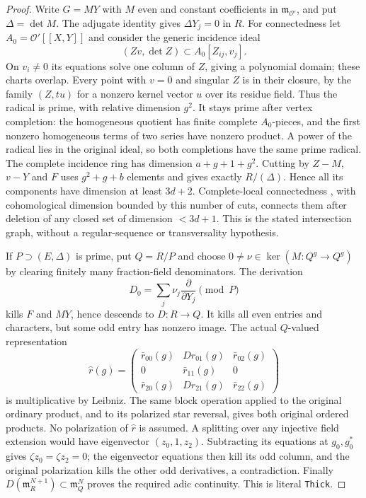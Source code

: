 \begin{proof}
Write $G=MY$ with $M$ even and constant coefficients in
$\mathfrak m_{\mathcal O'}$, and put $\Delta=\det M$.
The adjugate identity gives $\Delta Y_j=0$ in $R$.
For connectedness let $A_0=\mathcal O'[[X,Y]]$ and consider the
generic incidence ideal
\begin{equation}\label{eq:rankthree-incidence}
                  (Zv,\det Z)\subset A_0[Z_{ij},v_j].
\end{equation}
On $v_i\ne0$ its equations solve one column of $Z$, giving a
polynomial domain; these charts overlap.  Every point with $v=0$
and singular $Z$ is in their closure, by the family $(Z,tu)$ for
a nonzero kernel vector $u$ over its residue field.  Thus the
radical is prime, with relative dimension $g^2$.
It stays prime after vertex completion: the homogeneous quotient
has finite complete $A_0$-pieces, and the first nonzero homogeneous
terms of two series have nonzero product.  A power of the radical
lies in the original ideal, so both completions have the same
prime radical.  The complete incidence ring has dimension
$a+g+1+g^2$.  Cutting by $Z-M$, $v-Y$ and $F$ uses $g^2+g+b$
elements and gives exactly $R/(\Delta)$.  Hence all its components
have dimension at least $3d+2$.  Complete-local connectedness
\cite{support-ranktwo-connectedness}, with cohomological dimension
bounded by this number of cuts, connects them after deletion of
any closed set of dimension $<3d+1$.  This is the stated intersection
graph, without a regular-sequence or transversality hypothesis.

If $P\supset(E,\Delta)$ is prime, put $Q=R/P$ and choose
$0\ne\nu\in\ker(M:Q^g\to Q^g)$ by clearing finitely many
fraction-field denominators.  The derivation
\[
 D_0=\sum_j\nu_j\frac{\partial}{\partial Y_j}\pmod P
\]
kills $F$ and $MY$, hence descends to $D:R\to Q$.  It kills all
even entries and characters, but some odd entry has nonzero image.
The actual $Q$-valued representation
\begin{equation}\label{eq:rankthree-thick-matrix}
 \widehat r(g)=
 \begin{pmatrix}\bar r_{00}(g)&D r_{01}(g)&\bar r_{02}(g)\\
 0&\bar r_{11}(g)&0\\\bar r_{20}(g)&D r_{21}(g)&\bar r_{22}(g)\end{pmatrix}
\end{equation}
is multiplicative by Leibniz.  The same block operation applied to
the original ordinary product, and to its polarized star reversal,
gives both original ordered products.  No polarization of
$\widehat r$ is assumed.  A splitting over any injective field
extension would have eigenvector $(z_0,1,z_2)$.  Subtracting its
equations at $g_0,g_0^*$ gives $\zeta z_0=\zeta z_2=0$;
the eigenvector equations then kill its odd column, and the original
polarization kills the other odd derivatives, a contradiction.
Finally $D(\mathfrak m_R^{N+1})\subset\mathfrak m_Q^N$ proves
the required adic continuity.  This is literal \texttt{Thick}.


\end{proof}
